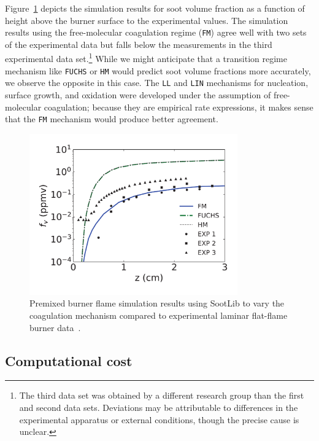 \documentclass[preprint,letterpaper]{elsarticle}
\begin{document}
Figure~\ref{f:soot-premix} depicts the simulation results for soot volume fraction as a function of height above the burner surface to the experimental values. The simulation results using the free-molecular coagulation regime (\texttt{FM}) agree well with two sets of the experimental data but falls below the measurements in the third experimental data set.\footnote{The third data set was obtained by a different research group than the first and second data sets. Deviations may be attributable to differences in the experimental apparatus or external conditions, though the precise cause is unclear.} While we might anticipate that a transition regime mechanism like \texttt{FUCHS} or \texttt{HM} would predict soot volume fractions more accurately, we observe the opposite in this case. The \texttt{LL} and \texttt{LIN} mechanisms for nucleation, surface growth, and oxidation were developed under the assumption of free-molecular coagulation; because they are empirical rate expressions, it makes sense that the \texttt{FM} mechanism would produce better agreement.
%
\begin{figure}
    \begin{center}
        \includegraphics[width=0.8\textwidth]{../figures/burner_COMPARE}
    \end{center}
    \caption{Premixed burner flame simulation results using SootLib to vary the coagulation mechanism compared to experimental laminar flat-flame burner data~\cite{Xu_1997,Menon_2007}.}
    \label{f:soot-premix}
\end{figure}
%

\subsection{Computational cost}
\label{s:soot-examples-compcost}
\end{document}
